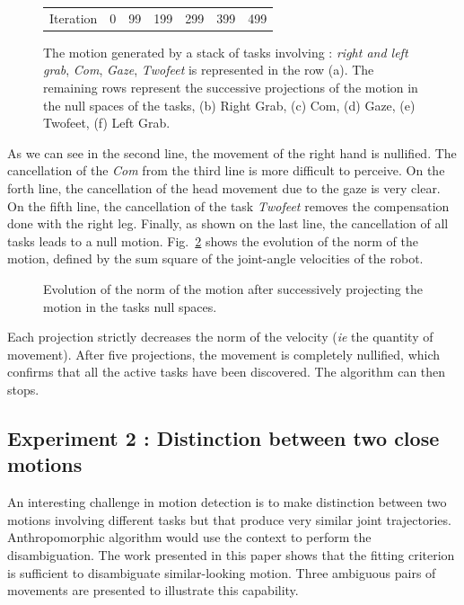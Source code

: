 \documentclass[letterpaper, 10pt, conference]{ieeeconf}      %
\begin{document}
\begin{figure}[t]
\begin{tabular}{c@{}c@{}c@{}c@{}c@{}c@{}c}
\\
Iteration & 0 & 99 & 199 & 299 & 399 & 499\\
\end{tabular}
\caption{The motion generated by a stack of tasks involving :
\emph{right and left grab}, \emph{Com}, \emph{Gaze}, \emph{Twofeet} is represented in the row (a).
The remaining rows represent the successive projections of the motion in the null spaces of the tasks,
(b) Right Grab, (c) Com, (d) Gaze, (e) Twofeet, (f) Left Grab.}
\label{fig:snapshotXpqdot}
\end{figure}
As we can see in the second line, the movement of the right hand is nullified. The cancellation of
the \emph{Com} from the third line is more difficult to perceive. On the forth line, the cancellation
of the head movement due to the gaze is very clear. On the fifth line, the cancellation of the task \emph{Twofeet} 
removes the compensation done with the right leg. Finally, as shown on the last line,
the cancellation of all tasks leads to a null motion.
Fig.~\ref{fig:xp3Pqdot} shows the evolution of the norm of the motion,
defined by the sum square of the joint-angle velocities of the robot.
\begin{figure}[t]
\begin{center}
\resizebox{.48\textwidth}{!} {
      
    }
\end{center}
\caption{Evolution of the norm of the motion after successively projecting the motion in the
	tasks null spaces.}
\label{fig:xp3Pqdot}
\end{figure}
Each projection strictly decreases the norm of the velocity (\emph{ie} the quantity of  movement). After
five projections, the movement is completely nullified, which confirms that all the active tasks have been
discovered. The algorithm can then stops.

\subsection{Experiment 2 : Distinction between two close motions}
\label{sec:distinc}
An interesting challenge in motion detection
is to make distinction between two motions
involving different tasks but that produce very similar joint trajectories.
Anthropomorphic algorithm would use the context to perform the disambiguation.
The work presented in this paper shows that the fitting criterion
is sufficient to disambiguate similar-looking motion. Three ambiguous pairs of movements
are presented to illustrate this capability.
\end{document}
